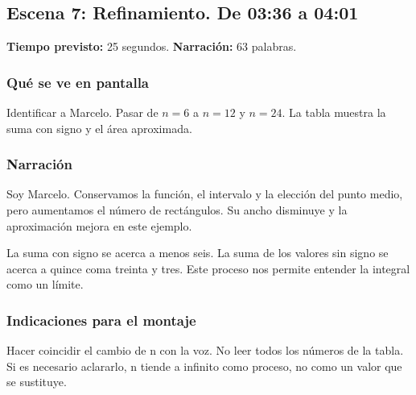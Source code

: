\documentclass[11pt,a4paper]{article}
\newcommand{\escena}[4]{\textbf{Escena #1: #2.} De #3 a #4}
\begin{document}
\noindent\begin{minipage}[t]{\textwidth}
\subsection*{\escena{7}{Refinamiento}{03:36}{04:01}}

\textbf{Tiempo previsto:} 25 segundos. \textbf{Narración:} 63 palabras.

\subsubsection*{Qué se ve en pantalla}
Identificar a Marcelo. Pasar de $n=6$ a $n=12$ y $n=24$. La tabla muestra la suma con signo y el área aproximada.

\subsubsection*{Narración}
Soy Marcelo. Conservamos la función, el intervalo y la elección del punto medio, pero aumentamos el número de rectángulos. Su ancho disminuye y la aproximación mejora en este ejemplo.

La suma con signo se acerca a menos seis. La suma de los valores sin signo se acerca a quince coma treinta y tres. Este proceso nos permite entender la integral como un límite.

\subsubsection*{Indicaciones para el montaje}
Hacer coincidir el cambio de n con la voz. No leer todos los números de la tabla. Si es necesario aclararlo, n tiende a infinito como proceso, no como un valor que se sustituye.
\end{minipage}\par\medskip
\end{document}
